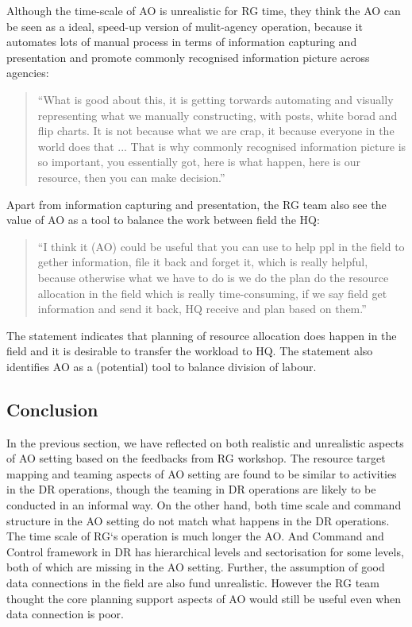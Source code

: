 Although the time-scale of AO is unrealistic for RG time,  they think the AO can be seen as a ideal, speed-up version of mulit-agency operation, because it automates lots of manual process in terms of information capturing and presentation and promote commonly recognised information picture across agencies:

\begin{quotation}
``What is good about this, it is getting torwards automating and visually representing what we manually constructing, with posts, white borad and flip charts. It is not because what we are crap, it because everyone in the world does that ...  That is why commonly recognised information picture is so important, you essentially got, here is what happen, here is our resource, then you can make decision.''
\end{quotation}

Apart from information capturing and presentation, the RG team also see the value of AO as a tool to balance the work between field the HQ: 

\begin{quotation}
``I think it (AO) could be useful that you can use to help ppl in the field to gether information, file it back and forget it, which is really helpful, because otherwise what we have to do is we do the plan do the resource allocation in the field which is really time-consuming, if we say field get information and send it back, HQ receive and plan based on them.''
\end{quotation}

The statement indicates that planning of resource allocation does happen in the field and it is desirable to transfer the workload to HQ. The statement also identifies AO as a (potential) tool to balance division of labour. 


\subsection{Conclusion}
In the previous section, we have reflected on both realistic and unrealistic aspects of AO setting based on the feedbacks from RG workshop. The resource target mapping and teaming aspects of AO setting are found to be similar to activities in the DR operations, though the teaming in DR operations are likely to be conducted in an informal way. On the other hand, both time scale and command structure in the AO setting do not match what happens in the DR operations. The time scale of RG`s operation is much longer the AO. And Command and Control framework in DR has hierarchical levels and sectorisation for some levels, both of which are missing in the AO setting. Further, the assumption of good data connections in the field are also fund unrealistic. However the RG team thought the core planning support aspects of AO would still be useful even when data connection is poor. \\

